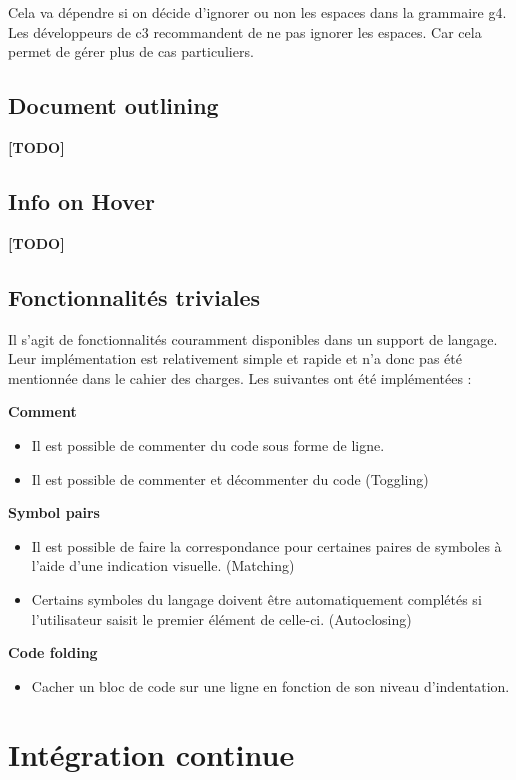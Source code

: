 \documentclass[
    iict, %
    il, %
]{heig-tb}
\begin{document}
Cela va dépendre si on décide d'ignorer ou non les espaces dans la grammaire g4.
Les développeurs de c3 recommandent de ne pas ignorer les espaces. Car cela permet de gérer plus de cas particuliers.

\section{Document outlining}
\textbf{[TODO]}

\section{Info on Hover}
\textbf{[TODO]}

\section{Fonctionnalités triviales}
Il s'agit de fonctionnalités couramment disponibles dans un support de langage. Leur implémentation est relativement simple et rapide et n'a donc pas été mentionnée dans le cahier des charges.
Les suivantes ont été implémentées :

\textbf{Comment}
\begin{itemize}
    \item Il est possible de commenter du code sous forme de ligne.
    \item Il est possible de commenter et décommenter du code (Toggling)
\end{itemize}

\textbf{Symbol pairs}
\begin{itemize}
    \item Il est possible de faire la correspondance pour certaines paires de symboles à l'aide d'une indication visuelle. (Matching)
    \item Certains symboles du langage doivent être automatiquement complétés si l'utilisateur saisit le premier élément de celle-ci. (Autoclosing)
\end{itemize}

\textbf{Code folding}
\begin{itemize}
    \item Cacher un bloc de code sur une ligne en fonction de son niveau d'indentation.
\end{itemize}

\chapter{Intégration continue}
\end{document}
